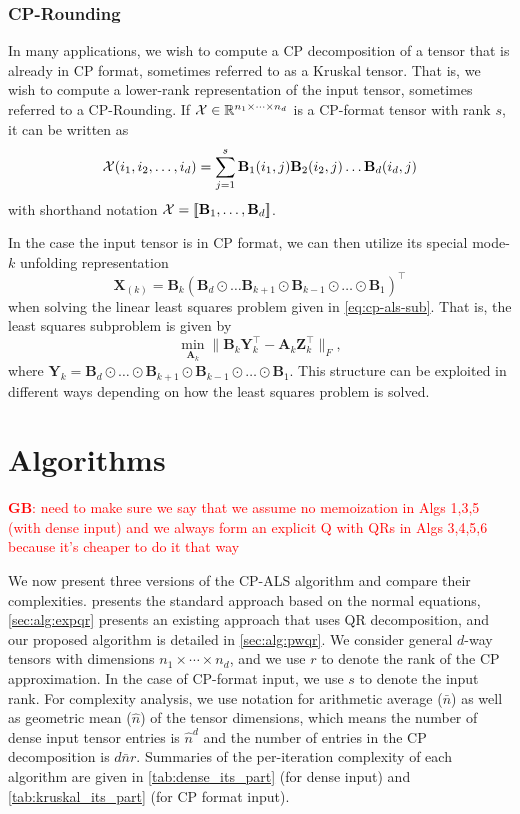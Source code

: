 \documentclass{article}
\newcommand{\mat}[1]{\mathbf{#1}}
\newcommand{\T}[2][]{#1{\mathbf{\cal{#2}}}} 						%
\newcommand{\GB}[1]{\textcolor{red}{\textbf{GB}: #1}}
\begin{document}
\subsubsection{CP-Rounding}
\label{sec:cp-rounding}

In many applications, we wish to compute a CP decomposition of a tensor that is already in CP format, sometimes referred to as a Kruskal tensor.
That is, we wish to compute a lower-rank representation of the input tensor, sometimes referred to a CP-Rounding.
If $\T{X} \in \mathbb{R}^{n_1 \times \dots \times n_d}$ is a CP-format tensor with rank $s$, it can be written as 
$$\T{X}(i_1,i_2,\dots, i_d) = \sum^{s}_{j=1} \mat{B}_1(i_1,j)\mat{B}_2(i_2,j) \dots \mat{B}_d(i_d,j)$$
with shorthand notation {$\T{X} = [\![\mat{B}_{1}, \dots ,\mat{B}_{d}]\!]$}.

In the case the input tensor is in CP format, we can then utilize its special mode-$k$ unfolding representation 
$$\mat{X}_{(k)} = \mat{B}_k(\mat{B}_d \odot \dots \mat{B}_{k+1} \odot \mat{B}_{k-1} \odot \dots \odot \mat{B}_1)^\top$$
when solving the linear least squares problem given in \cref{eq:cp-als-sub}. 
That is, the least squares subproblem is given by 
\begin{equation}
\label{eq:cp-als-sub-ktensor}
\min_{\mat{A}_k}\|\mat{B}_{k}\mat{Y}_k^\top-\mat{A}_k\mat{Z}_k^\top\|_F,
\end{equation}
where $\mat{Y}_k = \mat{B}_d \odot \dots \odot \mat{B}_{k+1} \odot \mat{B}_{k-1} \odot \dots \odot \mat{B}_1$.
This structure can be exploited in different ways depending on how the least squares problem is solved.


\section{Algorithms} 
\label{sec:algo}

\GB{need to make sure we say that we assume no memoization in Algs 1,3,5 (with dense input) and we always form an explicit Q with QRs in Algs 3,4,5,6 because it's cheaper to do it that way}

We now present three versions of the CP-ALS algorithm and compare their complexities.
 presents the standard approach based on the normal equations, \cref{sec:alg:expqr} presents an existing approach that uses QR decomposition, and our proposed algorithm is detailed in \cref{sec:alg:pwqr}.
We consider general $d$-way tensors with dimensions $n_1 \times \cdots \times n_d$, and we use $r$ to denote the rank of the CP approximation.
In the case of CP-format input, we use $s$ to denote the input rank.
For complexity analysis, we use notation for arithmetic average ($\bar n$) as well as geometric mean ($\hat n$) of the tensor dimensions, which means the number of dense input tensor entries is $\hat n^d$ and the number of entries in the CP decomposition is $d\bar n r$.
Summaries of the per-iteration complexity of each algorithm are given in \cref{tab:dense_its_part} (for dense input) and \cref{tab:kruskal_its_part} (for CP format input).
\end{document}
